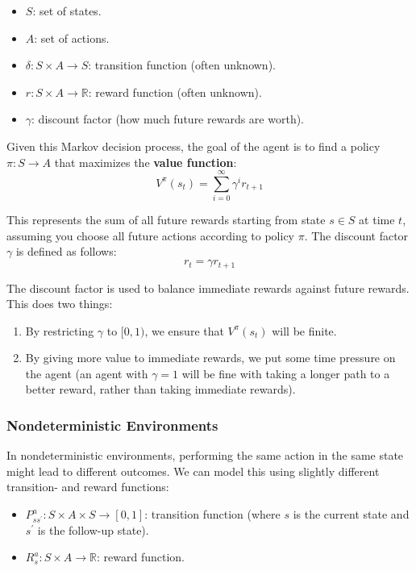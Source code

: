 \documentclass[12pt]{article}
\begin{document}
\begin{itemize}
    \item $S$: set of states.
    \item $A$: set of actions.
    \item $\delta: S \times A \rightarrow S$: transition function (often unknown).
    \item $r: S \times A \rightarrow \mathbb{R}$: reward function (often unknown).
    \item $\gamma$: discount factor (how much future rewards are worth).
\end{itemize}

\noindent
Given this Markov decision process, the goal of the agent is to find a policy $\pi: S \rightarrow A$ that maximizes the \textbf{value function}:
\[ V^\pi(s_t) = \sum_{i = 0}^{\infty} \gamma^i r_{t + 1} \]

\noindent
This represents the sum of all future rewards starting from state $s \in S$ at time $t$, assuming you choose all future actions according to policy $\pi$.
The discount factor $\gamma$ is defined as follows:
\[ r_t = \gamma r_{t + 1} \]

\noindent
The discount factor is used to balance immediate rewards against future rewards.
This does two things:

\begin{enumerate}
    \item By restricting $\gamma$ to $[0, 1)$, we ensure that $V^\pi(s_t)$ will be finite.
    \item By giving more value to immediate rewards, we put some time pressure on the agent (an agent with $\gamma = 1$ will be fine with taking a longer path to a better reward, rather than taking immediate rewards).
\end{enumerate}

\newpage
\subsubsection{Nondeterministic Environments}
In nondeterministic environments, performing the same action in the same state might lead to different outcomes.
We can model this using slightly different transition- and reward functions:

\begin{itemize}
    \item $P^a_{ss^\prime}: S \times A \times S \rightarrow [0, 1]$: transition function (where $s$ is the current state and $s^\prime$ is the follow-up state).
    \item $R^a_s: S \times A \rightarrow \mathbb{R}$: reward function.
\end{itemize}
\end{document}
